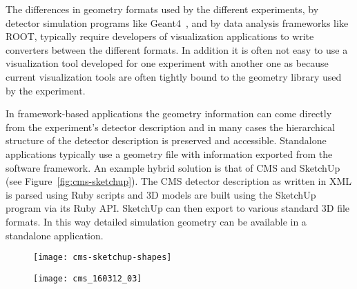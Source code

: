 \documentclass[12pt,a4paper]{article}
\begin{document}
The differences in geometry formats used by the different experiments, by detector simulation programs like Geant4~\cite{Geant4},
and by data analysis frameworks like ROOT, typically require developers of visualization applications to write converters
between the different formats. In addition it is often not easy to use a visualization tool developed for one experiment with another one as
because current visualization tools are often tightly bound to the geometry library used by the experiment.

In framework-based applications the geometry information can come directly from the experiment's detector description and in
 many cases the hierarchical structure of the detector description is preserved and accessible. Standalone applications
typically use a geometry file with information exported from the software framework. An example hybrid solution is that
of CMS and SketchUp~\cite{CMSSketchUp} (see Figure~\ref{fig:cms-sketchup}).
The CMS detector description as written in XML is parsed using Ruby scripts and 3D models are built using the
SketchUp program via its Ruby API. SketchUp can then export to various standard 3D file formats. In this way
detailed simulation geometry can be available in a standalone application.

\begin{figure*}
	\centering
	\begin{subfigure}[b]{0.475\textwidth}
		\centering
		\texttt{[image: cms-sketchup-shapes]}
		\caption[Converting the CMS detector geometry data to 3D meshes]{{\small}}
		\label{fig:ed-sketchup-a}
	\end{subfigure}
	\quad
	\begin{subfigure}[b]{0.475\textwidth}
		\centering
		\texttt{[image: cms\_160312\_03]}
		\caption[Rendering the CMS geometry in the SketchUp 3D software]%
		{{\small }}
		\label{fig:cms-sketchup-b}
	\end{subfigure}
	\caption[Using 3D editing software for HEP Geometry]
	{\small Use of a 3D software (SketchUp) to render the basic geometrical shapes imported from the CMS detector description and the final volumes \cite{CMSSketchUpImages}.}
	\label{fig:cms-sketchup}
\end{figure*}

\end{document}
